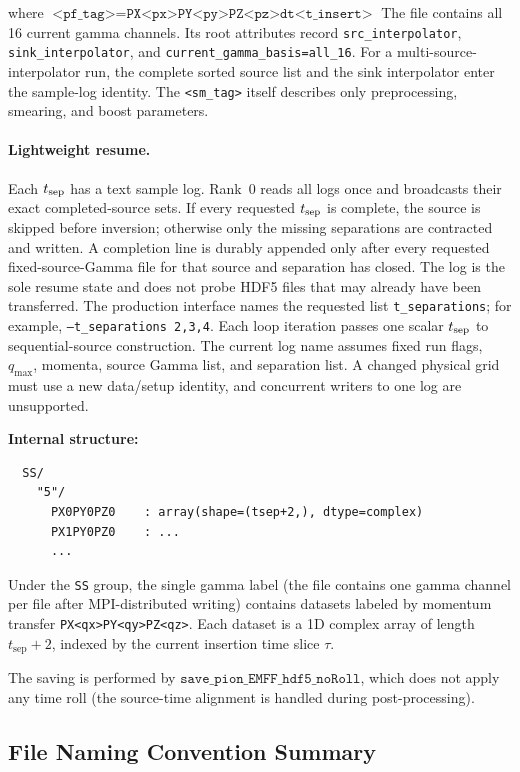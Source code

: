 \documentclass[11pt,a4paper]{article}
\begin{document}
where \(\texttt{<pf\_tag>} = \texttt{PX<px>PY<py>PZ<pz>dt<t\_insert>}\)
The file contains all 16 current gamma channels.  Its root attributes record
\texttt{src\_interpolator}, \texttt{sink\_interpolator}, and
\texttt{current\_gamma\_basis=all\_16}.  For a multi-source-interpolator run,
the complete sorted source list and the sink interpolator enter the sample-log
identity.  The \texttt{<sm\_tag>} itself describes only preprocessing,
smearing, and boost parameters.

\paragraph{Lightweight resume.}
Each \(t_{\rm sep}\) has a text sample log.  Rank~0 reads all logs once and
broadcasts their exact completed-source sets.  If every requested
\(t_{\rm sep}\) is complete, the source is skipped before inversion; otherwise
only the missing separations are contracted and written.  A completion line is
durably appended only after every requested fixed-source-Gamma file for that
source and separation has closed.  The log is the sole resume state and does
not probe HDF5 files that may already have been transferred.
The production interface names the requested list
\texttt{t\_separations}; for example,
\texttt{--t\_separations 2,3,4}.  Each loop iteration passes one scalar
\(t_{\rm sep}\) to sequential-source construction.
The current log name assumes fixed run flags, \(q_{\max}\), momenta, source
Gamma list, and separation list.  A changed physical grid must use a new
data/setup identity, and concurrent writers to one log are unsupported.

\textbf{Internal structure:}
\begin{verbatim}
  SS/
    "5"/
      PX0PY0PZ0    : array(shape=(tsep+2,), dtype=complex)
      PX1PY0PZ0    : ...
      ...
\end{verbatim}

Under the \texttt{SS} group, the single gamma label (the file contains one gamma
channel per file after MPI-distributed writing) contains datasets labeled by
momentum transfer \texttt{PX<qx>PY<qy>PZ<qz>}.  Each dataset is a 1D complex array
of length \(t_{\text{sep}}+2\), indexed by the current insertion time slice
\(\tau\).

The saving is performed by \(\texttt{save\_pion\_EMFF\_hdf5\_noRoll}\), which
does not apply any time roll (the source-time alignment is handled during
post-processing).

\subsection{File Naming Convention Summary}
\end{document}
